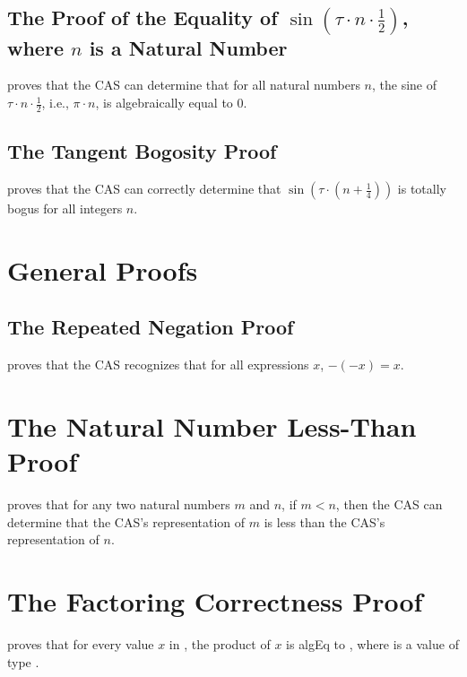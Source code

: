\documentclass{report}
\begin{document}
\subsection{The Proof of the Equality of \(\operatorname{sin} \left(\tau \cdot n \cdot \frac12\right)\), where \(n\) is a Natural Number}
  proves that the  CAS can determine that for all natural numbers \(n\), the sine of \(\tau \cdot n \cdot \frac12\), i.e., \(\pi \cdot n\), is algebraically equal to \(0\).

\subsection{The Tangent Bogosity Proof}
  proves that the  CAS can correctly determine that \(\sin \left(\tau \cdot \left(n + \frac{1}{4}\right)\right)\) is totally bogus for all integers \(n\).

\section{General Proofs}

\subsection{The Repeated Negation Proof}
  proves that the  CAS recognizes that for all expressions \(x\), \(- \left(- x\right) = x\).

\section{The Natural Number Less-Than Proof}
  proves that for any two natural numbers \(m\) and \(n\), if \(m < n\), then the  CAS can determine that the  CAS's representation of \(m\) is less than the  CAS's representation of \(n\).

\section{The Factoring Correctness Proof}
  proves that for every value \(x\) in   , the product of \(x\) is \gls{algEq} to , where  is a value of type  .
\end{document}
